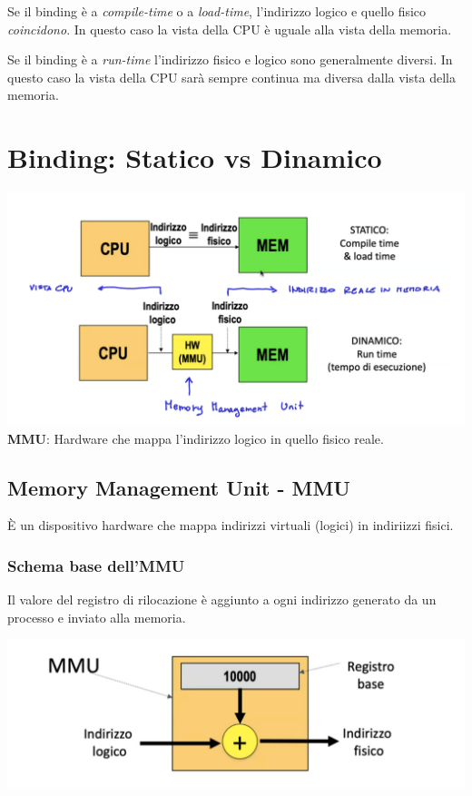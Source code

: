\documentclass[a4paper,12pt, twoside]{report}
\begin{document}
Se il binding \`e a \emph{compile-time} o a \emph{load-time}, l'indirizzo logico e quello 
fisico \emph{coincidono}. In questo caso la vista della CPU \`e uguale alla vista della 
memoria.

Se il binding \`e a \emph{run-time} l'indirizzo fisico e logico sono generalmente diversi.
In questo caso la vista della CPU sar\`a sempre continua ma diversa dalla vista della memoria.

\section{Binding: Statico vs Dinamico}

\begin{center}
\includegraphics[scale=0.15]{staticVsDynamic}
    \tiny{\textbf{MMU}: Hardware che mappa l'indirizzo logico in quello fisico reale.} 
\end{center}

\subsection{Memory Management Unit - MMU}

\`E un dispositivo hardware che mappa indirizzi virtuali (logici) in indiriizzi fisici.

\subsubsection{Schema base dell'MMU}
Il valore del registro di rilocazione \`e aggiunto a ogni indirizzo generato da un processo 
e inviato alla memoria. 

\begin{center}
    \includegraphics[scale=0.3]{mmu}
\end{center} 
\end{document}
